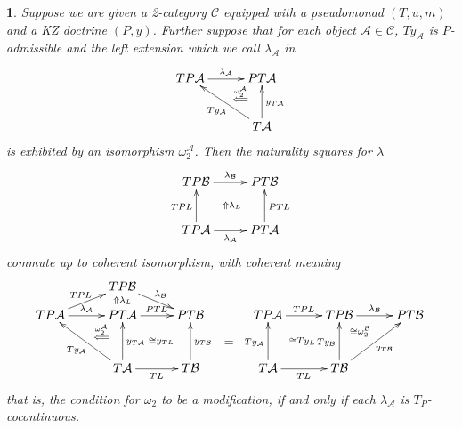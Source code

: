 \documentclass[a4paper,oneside,english]{amsart}
\numberwithin{equation}{section}
\numberwithin{figure}{section}
\theoremstyle{plain}
\theoremstyle{definition}
\theoremstyle{remark}
\theoremstyle{definition}
\theoremstyle{plain}
\theoremstyle{plain}
\theoremstyle{plain}
\newtheorem{lem}[thm]{\protect\lemmaname}
\providecommand{\lemmaname}{Lemma}
\begin{document}
\begin{lem}
\label{lambdaccts} Suppose we are given a 2-category $\mathscr{C}$
equipped with a pseudomonad $\left(T,u,m\right)$ and a KZ doctrine
$\left(P,y\right)$. Further suppose that for each object $\mathcal{A}\in\mathscr{C}$,
$Ty_{\mathcal{A}}$ is \emph{$P$-}admissible and the left extension
which we call $\lambda_{\mathcal{A}}$ in
\[
\xymatrix@=1em{TP\mathcal{A}\ar[rr]^{\lambda_{\mathcal{A}}} &  & PT\mathcal{A}\ar@{}[dl]|-{\stackrel{\omega_{2}^{\mathcal{\mathcal{A}}}}{\Longleftarrow}}\\
 & \;\\
 &  & T\mathcal{A}\ar[uu]_{y_{T\mathcal{A}}}\ar[uull]^{Ty_{\mathcal{A}}}
}
\]
is exhibited by an isomorphism $\omega_{2}^{\mathcal{\mathcal{A}}}$.
Then the naturality squares for $\lambda$
\[
\xymatrix@=1em{TP\mathcal{B}\ar[rr]^{\lambda_{\mathcal{B}}} &  & PT\mathcal{B}\\
\\
TP\mathcal{A}\ar[rr]_{\lambda_{\mathcal{A}}}\ar[uu]^{TPL}\ar@{}[urur]|-{\Uparrow\lambda_{L}} &  & PT\mathcal{A}\ar[uu]_{PTL}
}
\]
commute up to coherent isomorphism, with coherent meaning
\[
\xymatrix@=1em{ &  & TP\mathcal{B}\ar[rrd]^{\lambda_{\mathcal{B}}}\\
TP\mathcal{A}\ar[rr]^{\lambda_{\mathcal{A}}}\ar[rru]^{TPL} &  & PT\mathcal{A}\ar@{}[dl]|-{\stackrel{\omega_{2}^{\mathcal{\mathcal{A}}}}{\Longleftarrow}}\ar[rr]^{PTL}\ar@{}[rdrd]|-{\quad\cong y_{TL}}\ar@{}[u]|-{\Uparrow\lambda_{L}} &  & PT\mathcal{B} &  & TP\mathcal{A}\ar[rr]^{TPL}\ar@{}[ddrr]|-{\cong Ty_{L}} &  & TP\mathcal{B}\ar[rr]^{\lambda_{\mathcal{B}}} &  & PT\mathcal{B}\\
 & \; &  &  &  & = &  & \; &  & \;\ar@{}[ul]|-{\cong\omega_{2}^{\mathcal{B}}}\\
 &  & T\mathcal{A}\ar[uu]_{y_{T\mathcal{A}}}\ar[uull]^{Ty_{\mathcal{A}}}\ar[rr]_{TL} &  & T\mathcal{B}\ar[uu]_{y_{T\mathcal{B}}} &  & T\mathcal{A}\ar[uu]^{Ty_{\mathcal{A}}}\ar[rr]_{TL} &  & T\mathcal{B}\ar[uurr]_{y_{T\mathcal{B}}}\ar[uu]^{Ty_{\mathcal{B}}}
}
\]
that is, the condition for $\omega_{2}$ to be a modification, if
and only if each $\lambda_{\mathcal{A}}$ is $T_{P}$-cocontinuous.\end{lem}
\end{document}
